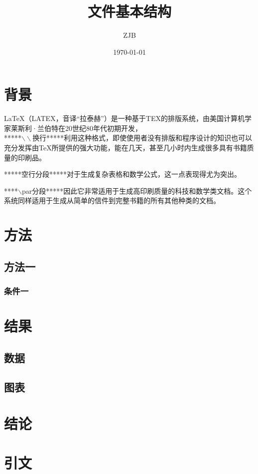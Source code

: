 \documentclass{ctexart}
\title{文件基本结构}
\author{ZJB}
\date{\today}
\begin{document}
	\maketitle
	\section{背景}
	LaTeX（LATEX，音译“拉泰赫”）是一种基于ΤΕΧ的排版系统，由美国计算机学家莱斯利·兰伯特在20世纪80年代初期开发，\\*****{$\backslash\backslash$}换行*****利用这种格式，即使使用者没有排版和程序设计的知识也可以充分发挥由TeX所提供的强大功能，能在几天，甚至几小时内生成很多具有书籍质量的印刷品。
	
	*****空行分段*****对于生成复杂表格和数学公式，这一点表现得尤为突出。\par *****{$\backslash$}par分段*****因此它非常适用于生成高印刷质量的科技和数学类文档。这个系统同样适用于生成从简单的信件到完整书籍的所有其他种类的文档。
	
	\section{方法}
	\subsection{方法一}
	\subsubsection{条件一}
	\section{结果}
	\subsection{数据}
	\subsection{图表}
	\section{结论}
	\section{引文}
\end{document}
